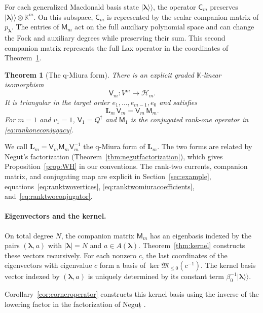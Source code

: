 \documentclass[11pt]{amsart}
\newtheorem{theorem}{Theorem}[section]
\theoremstyle{definition}
\theoremstyle{remark}
\newcommand{\K}{\mathbb K}                       %
\newcommand{\betaz}{\beta_0}                     %
\newcommand{\bl}{{\boldsymbol{\lambda}}}         %
\newcommand{\Add}[1]{A(#1)}                      %
\newcommand{\HH}{\mathcal H}
\newcommand{\Hsp}[1]{\HH_{#1}}                   %
\newcommand{\auxe}[1]{e_{#1}}                    %
\newcommand{\kket}[1]{\lvert #1\rangle\!\rangle} %
\newcommand{\LL}{\mathbf L}
\newcommand{\Lax}[1]{\LL_{#1}}                   %
\newcommand{\CC}{\mathsf C}
\newcommand{\Comp}[1]{\CC_{#1}}                  %
\newcommand{\MM}{\mathsf M}
\newcommand{\Miura}[1]{\MM_{#1}}                 %
\newcommand{\VV}{\mathsf V}
\newcommand{\Vconj}[1]{\VV_{#1}}                 %
\newcommand{\Miuraop}{\mathfrak M}               %
\newcommand{\Miuraproj}{\Miuraop_{\leq0}}         %
\newcommand{\Qan}{Q^\dagger}                     %
\newcommand{\Negut}{Neguț}
\begin{document}
For each generalized Macdonald basis state \(\kket{\bl}\), the operator
\(\Comp{m}\) preserves \(\kket{\bl}\otimes\K^m\).
On this subspace, \(\Comp{m}\) is represented by the scalar companion matrix of \(p_\bl\).
The entries of \(\Miura{m}\) act on
the full auxiliary polynomial space and can change the Fock and auxiliary
degrees while preserving their sum. This second companion matrix represents
the full Lax operator in the coordinates of Theorem~\ref{thm:companion}.

\begin{theorem}[The q-Miura form]\label{thm:companion}
There is an explicit graded \(\K\)-linear isomorphism
\[
 \Vconj{m}\colon V^m\longrightarrow\Hsp{m}.
\]
It is triangular in the target order \(\auxe{1},\dots,\auxe{m-1},\auxe{0}\) and satisfies
\[
 \boxed{\;\Lax{m}\,\Vconj{m}=\Vconj{m}\,\Miura{m}.\;}
\]
For \(m=1\) and \(v_1=1\), \(\Vconj{1}=\Qan\) and
\(\Miura{1}\) is the conjugated rank-one operator in \eqref{eq:rankoneconjugacy}.
\end{theorem}

We call \(\Lax{m}=\Vconj{m}\Miura{m}\Vconj{m}^{-1}\) the q-Miura form of \(\Lax{m}\). The two forms
are related by \Negut's \cite{N3} factorization (Theorem~\ref{thm:negutfactorization}),
which gives Proposition~\ref{prop:WH} in our conventions.
The rank-two currents, companion matrix, and conjugating map are explicit in
Section~\ref{sec:example}, equations~\eqref{eq:ranktwovertices},
\eqref{eq:ranktwomiuracoefficients}, and~\eqref{eq:ranktwoconjugator}.

\paragraph{Eigenvectors and the kernel.}
On total degree \(N\), the companion matrix \(\Miura{m}\) has an eigenbasis
indexed by the pairs \((\bl,a)\) with \(|\bl|=N\) and \(a\in\Add{\bl}\).
Theorem~\ref{thm:kernel} constructs these vectors recursively. For each
nonzero \(c\), the last coordinates of the eigenvectors with eigenvalue \(c\) form a basis of
\(\ker\Miuraproj(c^{-1})\). The kernel basis vector indexed by \((\bl,a)\)
is uniquely determined by its constant term \(\betaz^{-1}\kket{\bl}\).

Corollary~\ref{cor:corneroperator} constructs this kernel basis using the inverse
of the lowering factor in the factorization of \Negut{} \cite[Theorem~1.2]{N3}.
\end{document}
